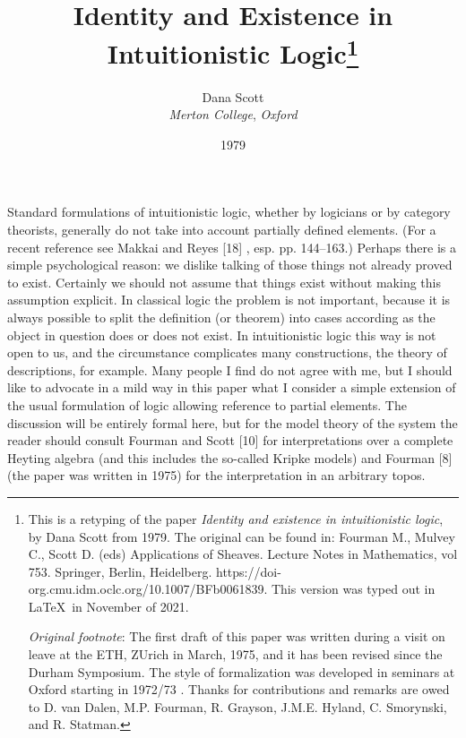 \title{\large Identity and Existence in Intuitionistic Logic\footnote{This is a retyping of the paper {\it Identity and existence in intuitionistic logic}, by Dana Scott from 1979. The original can be found in: Fourman M., Mulvey C., Scott D. (eds) Applications of Sheaves. Lecture Notes in Mathematics, vol 753. Springer, Berlin, Heidelberg. https://doi-org.cmu.idm.oclc.org/10.1007/BFb0061839. This version was typed out in \LaTeX\ in November of 2021.

{\it Original footnote}: The first draft of this paper was written during a visit on leave at the ETH, ZUrich in March, 1975, and it has been revised since the Durham Symposium.
The style of formalization was developed in seminars at Oxford starting in 1972/73 . Thanks for contributions and remarks are owed to D. van Dalen, M.P. Fourman,
R. Grayson, J.M.E. Hyland, C. Smorynski, and R. Statman.}
}
\author{\normalsize Dana Scott \\
{\small {\small\it Merton College}, {\small\it Oxford}}}
\date{\small 1979}



\maketitle

Standard formulations of intuitionistic logic, whether by logicians or by category theorists, generally do not take into account partially defined elements. (For a recent reference see Makkai and Reyes [18] , esp. pp. 144--163.) Perhaps
there is a simple psychological reason: we dislike talking of those things not
already proved to exist. Certainly we should not assume that things exist without making this assumption explicit. In classical logic the problem is not important, because it is always possible to split the definition (or theorem) into cases according as the object in question does or does not exist. In intuitionistic logic this way is not open to us, and the circumstance complicates many constructions, the
theory of descriptions, for example. Many people I find do not agree with me, but
I should like to advocate in a mild way in this paper what I consider a simple extension of the usual formulation of logic allowing reference to partial elements. The discussion will be entirely formal here, but for the model theory of the system the reader should consult Fourman and Scott [10] for interpretations over a complete Heyting algebra (and this includes the so-called Kripke models) and Fourman [8]
(the paper was written in 1975) for the interpretation in an arbitrary topos.

